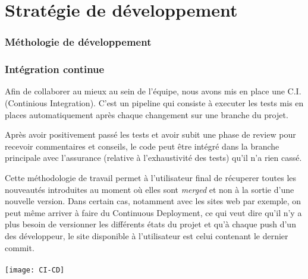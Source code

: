 \part{Stratégie de développement}
\section{Méthologie de développement}

\section{Intégration continue}
Afin de collaborer au mieux au sein de l'équipe, nous avons mis en place
une C.I. (Continious Integration). C'est un pipeline qui consiste à executer
les tests mis en places automatiquement après chaque changement sur une branche
du projet.

Après avoir positivement passé les tests et avoir subit une phase de review
pour recevoir commentaires et conseils, le code peut être intégré dans la
branche principale avec l'assurance (relative à l’exhaustivité des tests) qu'il
n'a rien cassé.

Cette méthodologie de travail permet à l’utilisateur final de récuperer toutes
les nouveautés introduites au moment où elles sont \emph{merged} et non à la
sortie d’une nouvelle version. Dans certain cas, notamment avec les sites web
par exemple, on peut même arriver à faire du Continuous Deployment, ce qui veut
dire qu’il n’y a plus besoin de versionner les différents états du projet et
qu’à chaque push d’un des développeur, le site disponible à l’utilisateur est
celui contenant le dernier commit.
\\
\\
\texttt{[image: CI-CD]}
